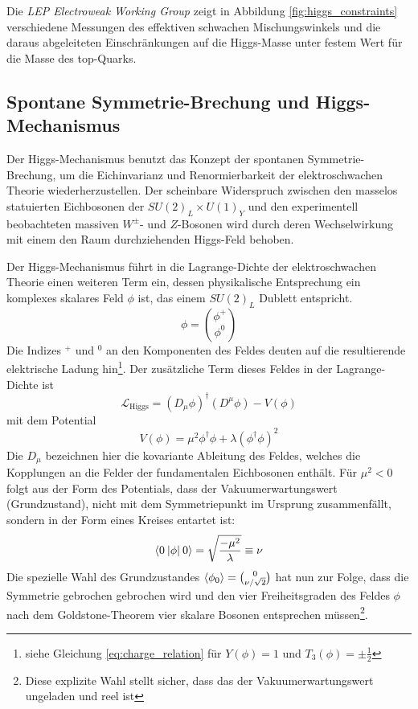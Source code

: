 Die \textit{LEP Electroweak Working Group} zeigt in Abbildung
\ref{fig:higgs_constraints} verschiedene Messungen des effektiven schwachen
Mischungswinkels und die daraus abgeleiteten Einschränkungen auf die
Higgs-Masse unter festem Wert für die Masse des top-Quarks.



\subsection{Spontane Symmetrie-Brechung und Higgs-Mechanismus}
\label{theory:higgs}
Der Higgs-Mechanismus benutzt das Konzept der spontanen Symmetrie-Brechung, um
die Eichinvarianz und Renormierbarkeit der elektroschwachen Theorie
wiederherzustellen. Der scheinbare Widerspruch zwischen den masselos
statuierten Eichbosonen der $SU(2)_L \times U(1)_Y$ und den experimentell
beobachteten massiven $W^\pm$- und $Z$-Bosonen wird durch deren Wechselwirkung
mit einem den Raum durchziehenden Higgs-Feld behoben.

Der Higgs-Mechanismus führt in die Lagrange-Dichte der elektroschwachen Theorie
einen weiteren Term ein, dessen physikalische Entsprechung ein komplexes
skalares Feld $\phi$ ist, das einem $SU(2)_L$ Dublett entspricht.
\begin{equation}
    \phi = \binom{\phi^+}{\phi^0}
\end{equation}
Die Indizes $^+$ und $^0$ an den Komponenten des Feldes deuten auf die
resultierende elektrische Ladung hin\footnote{siehe Gleichung
\ref{eq:charge_relation} für $Y(\phi)=1$ und $T_3(\phi)=\pm\tfrac{1}{2}$}.
Der zusätzliche Term dieses Feldes in der Lagrange-Dichte ist
\begin{equation}
    \mathcal{L}_\text{Higgs} = (D_\mu\phi)^\dagger(D^\mu\phi) - V(\phi)
\end{equation}
mit dem Potential
\begin{equation}
    V(\phi) = \mu^2\phi^\dagger\phi + \lambda (\phi^\dagger\phi )^2
\end{equation}
Die $D_\mu$ bezeichnen hier die kovariante Ableitung des Feldes, welches die
Kopplungen an die Felder der fundamentalen Eichbosonen enthält. Für $\mu^2<0$
folgt aus der Form des Potentials, dass der Vakuumerwartungswert
(Grundzustand), nicht mit dem Symmetriepunkt im Ursprung zusammenfällt, sondern
in der Form eines Kreises entartet ist:
\begin{equation}
    \braket{0\:|\phi|\:0} = \sqrt{\frac{-\mu^2}{\lambda}} \equiv \nu 
\end{equation}
Die spezielle Wahl des Grundzustandes $\braket{\phi_0}=\binom{0}{\nu/\sqrt{2}}$
hat nun zur Folge, dass die Symmetrie gebrochen gebrochen wird und den vier
Freiheitsgraden des Feldes $\phi$ nach dem Goldstone-Theorem vier skalare
Bosonen entsprechen müssen\footnote{Diese explizite Wahl stellt sicher, dass
das der Vakuumerwartungswert ungeladen und reel ist}.

